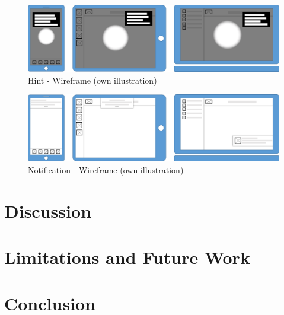 \begin{figure}
    \centering
    \includegraphics[width=\textwidth]{img/diagrams/wireframes/hint.png}
    \caption[General Layout - Wireframe]{Hint - Wireframe (own illustration)}
    \label{fig:}
\end{figure}

\begin{figure}
    \centering
    \includegraphics[width=\textwidth]{img/diagrams/wireframes/notification.png}
    \caption[General Layout - Wireframe]{Notification - Wireframe (own illustration)}
    \label{fig:}
\end{figure}

\chapter{Discussion}


\chapter{Limitations and Future Work}


\chapter{Conclusion}

\begin{itemize}

\end{itemize}